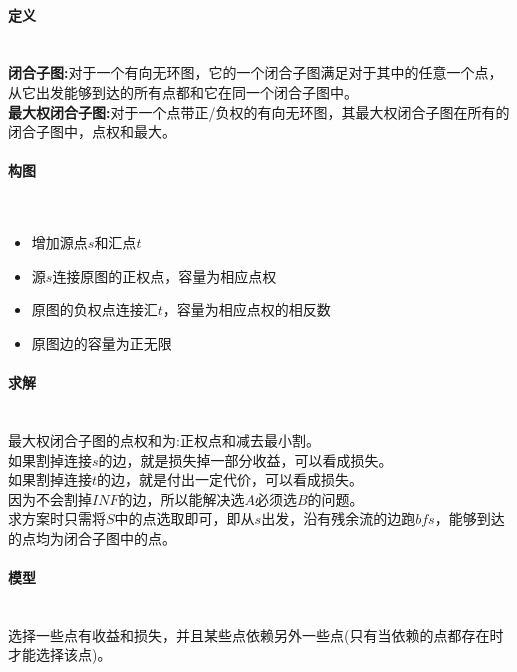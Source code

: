 \paragraph{定义}~{}
\\
\textbf{闭合子图:}对于一个有向无环图，它的一个闭合子图满足对于其中的任意一个点，从它出发能够到达的所有点都和它在同一个闭合子图中。\\
\textbf{最大权闭合子图:}对于一个点带正/负权的有向无环图，其最大权闭合子图在所有的闭合子图中，点权和最大。

\paragraph{构图}~{}
\\
\begin{itemize}
\item 增加源点$s$和汇点$t$
\item 源$s$连接原图的正权点，容量为相应点权
\item 原图的负权点连接汇$t$，容量为相应点权的相反数
\item 原图边的容量为正无限
\end{itemize}

\paragraph{求解}~{}
\\
最大权闭合子图的点权和为:正权点和减去最小割。\\
如果割掉连接$s$的边，就是损失掉一部分收益，可以看成损失。\\
如果割掉连接$t$的边，就是付出一定代价，可以看成损失。\\
因为不会割掉$INF$的边，所以能解决选$A$必须选$B$的问题。\\
求方案时只需将$S$中的点选取即可，即从$s$出发，沿有残余流的边跑$bfs$，能够到达的点均为闭合子图中的点。

\paragraph{模型}~{}
\\
选择一些点有收益和损失，并且某些点依赖另外一些点(只有当依赖的点都存在时才能选择该点)。\\